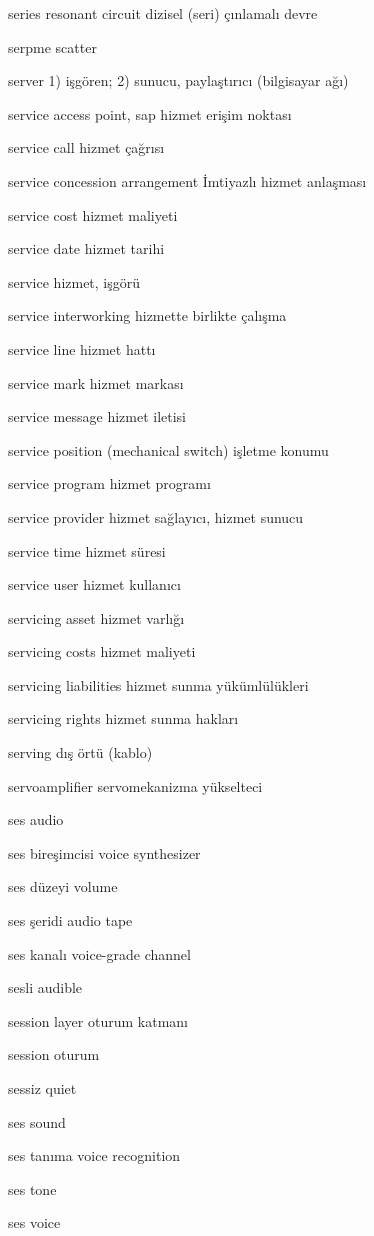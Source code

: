 \documentclass[12pt,fleqn]{article}\usepackage{../../common}
\begin{document}
series resonant circuit dizisel (seri) çınlamalı devre

serpme scatter

server 1) işgören; 2) sunucu, paylaştırıcı (bilgisayar ağı)

service access point, sap hizmet erişim noktası

service call hizmet çağrısı

service concession arrangement İmtiyazlı hizmet anlaşması

service cost hizmet maliyeti

service date hizmet tarihi

service hizmet, işgörü

service interworking hizmette birlikte çalışma

service line hizmet hattı

service mark hizmet markası

service message hizmet iletisi

service position (mechanical switch) işletme konumu

service program hizmet programı

service provider hizmet sağlayıcı, hizmet sunucu

service time hizmet süresi

service user hizmet kullanıcı

servicing asset hizmet varlığı

servicing costs hizmet maliyeti

servicing liabilities hizmet sunma yükümlülükleri

servicing rights hizmet sunma hakları

serving dış örtü (kablo)

servoamplifier servomekanizma yükselteci

ses audio

ses bireşimcisi voice synthesizer

ses düzeyi volume

ses şeridi audio tape

ses kanalı voice-grade channel

sesli audible

session layer oturum katmanı

session oturum

sessiz quiet

ses sound

ses tanıma voice recognition

ses tone

ses voice
\end{document}
